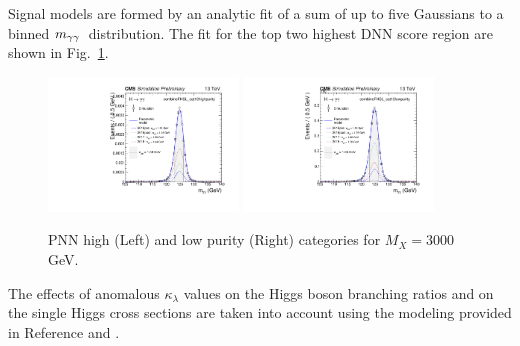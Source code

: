 Signal models are formed by an analytic fit of a sum of up to five Gaussians to a binned $m_{\gamma\gamma}\hspace{0.2em}$ distribution.
The fit for the top two highest DNN score region are shown in Fig.~\ref{fig:smodel_combineFHSL_cat12highpurity_MX3000}.
\begin{figure}[!htbp]
    \centering
    \includegraphics[width=0.45\textwidth]{figures/Signal_Modeling/MX3000_MH125_smodel_combineFHSL_cat12highpurity.pdf}%
    \includegraphics[width=0.45\textwidth]{figures/Signal_Modeling/MX3000_MH125_smodel_combineFHSL_cat12lowpurity.pdf}
    \caption{PNN high (Left) and low purity (Right) categories for $M_X = 3000$ GeV.}
    \label{fig:smodel_combineFHSL_cat12highpurity_MX3000}
\end{figure}


The effects of anomalous $\kappa_{\lambda}$ values on the Higgs boson branching ratios and on the single Higgs cross sections
are taken into account using the modeling provided in Reference \cite{Degrassi:2016wml} and \cite{Maltoni:2017ims}.



